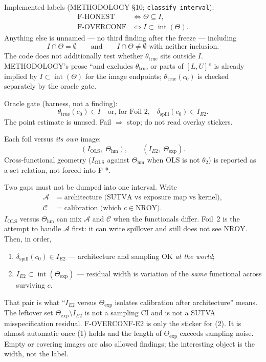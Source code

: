 \documentclass[11pt]{article}
\newcommand{\NROY}{\mathrm{NROY}}
\newcommand{\hm}{\mathrm{hm}}
\newcommand{\expset}{\mathrm{exp}}
\newcommand{\interior}{\operatorname{int}}
\newcommand{\Iols}{I_{\mathrm{OLS}}}
\newcommand{\Ie}{I_{E2}}
\begin{document}
Implemented labels (METHODOLOGY §10; \texttt{classify\_interval}):
\begin{align}
  \text{F-HONEST}
  &\iff \Theta\subseteq I, \\
  \text{F-OVERCONF}
  &\iff I\subset\interior(\Theta).
\end{align}
Anything else is unnamed --- no third finding after the freeze ---
including
\begin{equation}
  I\cap\Theta=\emptyset
  \qquad\text{and}\qquad
  I\cap\Theta\neq\emptyset
  \text{ with neither inclusion}.
\end{equation}
The code does not additionally test whether $\theta_{\mathrm{true}}$
sits outside $I$. METHODOLOGY's prose ``and excludes $\theta_{\mathrm{true}}$
or parts of $[L,U]$'' is already implied by $I\subset\interior(\Theta)$
for the image endpoints; $\theta_{\mathrm{true}}(c_0)$ is checked
separately by the oracle gate.

Oracle gate (harness, not a finding):
\begin{equation}
  \theta_{\mathrm{true}}(c_0)\in I
  \quad\text{or, for Foil~2,}\quad
  \delta_{\mathrm{spill}}(c_0)\in\Ie.
\end{equation}
The point estimate is unused. Fail $\Rightarrow$ stop; do not read
overlay stickers.

Each foil versus \emph{its own} image:
\begin{equation}
  (\Iols,\;\Theta_{\hm}),
  \qquad
  (\Ie,\;\Theta_{\expset}).
\end{equation}
Cross-functional geometry ($\Iols$ against $\Theta_{\hm}$ when OLS is
not $\theta_2$) is reported as a set relation, not forced into F-*.

Two gaps must not be dumped into one interval. Write
\begin{align*}
  \mathcal{A}
  &= \text{architecture (SUTVA vs exposure map vs kernel)}, \\
  \mathcal{C}
  &= \text{calibration (which }c\in\NROY\text{)}.
\end{align*}
$\Iols$ versus $\Theta_{\hm}$ can mix $\mathcal{A}$ and $\mathcal{C}$
when the functionals differ. Foil~2 is the attempt to handle
$\mathcal{A}$ first: it can write spillover and still does not see
$\NROY$. Then, in order,
\begin{enumerate}
  \item $\delta_{\mathrm{spill}}(c_0)\in\Ie$
        --- architecture and sampling OK \emph{at the world};
  \item $\Ie\subset\interior(\Theta_{\expset})$
        --- residual width is variation of the \emph{same} functional
        across surviving $c$.
\end{enumerate}
That pair is what ``$\Ie$ versus $\Theta_{\expset}$ isolates
calibration after architecture'' means. The leftover set
$\Theta_{\expset}\setminus\Ie$ is not a sampling CI and is not a
SUTVA misspecification residual. F-OVERCONF-E2 is only the sticker
for (2). It is almost automatic once (1) holds and
the length of $\Theta_{\expset}$ exceeds sampling noise. Empty or covering images
are also allowed findings; the interesting object is the width, not
the label.
\end{document}
